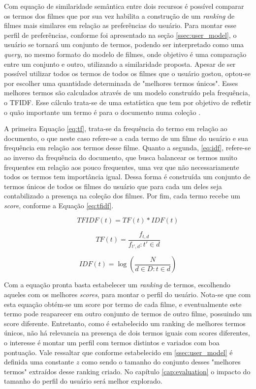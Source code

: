 Com equação de similaridade semântica entre dois recursos é possível comparar os termos dos filmes que por sua vez habilita a construção de um \textit{ranking} de filmes mais similares em relação as preferências do usuário. Para montar esse perfil de preferências, conforme foi apresentado na seção \ref{ssec:user_model}, o usuário se tornará um conjunto de termos, podendo ser interpretado como uma \textit{query}, no mesmo formato do modelo de filmes, onde objetivo é uma comparação entre um conjunto e outro, utilizando a similaridade proposta. Apesar de ser possível utilizar todos os termos de todos os filmes que o usuário gostou, optou-se por escolher uma quantidade determinada de "melhores termos únicos". Esses melhores termos são calculados através de um modelo construído pela frequência, o \ac{TFIDF}. Esse cálculo trata-se de uma estatística que tem por objetivo de refletir o quão importante um termo é para o documento numa coleção \citep{rajaraman_ullman_2011}.

A primeira Equação \ref{eq:tf}, trata-se da frequência do termo em relação ao documento, o que neste caso refere-se a cada termo de um filme do usuário e sua frequência em relação aos termos desse filme. Quanto a segunda, \ref{eq:idf}, refere-se ao inverso da frequência do documento, que busca balancear os termos muito frequentes em relação aos pouco frequentes, uma vez que não necessariamente todos os termos tem importância igual. Dessa forma é construída um conjunto de termos únicos de todos os filmes do usuário que para cada um deles seja contabilizado a presença na coleção dos filmes. Por fim, cada termo recebe um \textit{score}, conforme a Equação {\ref{eq:tfidf}}.

\begin{equation}
	TFIDF(t) = TF(t) * IDF(t)
\label{eq:tfidf}
\end{equation}

\begin{equation}
	TF(t) = \frac{f_{t,d}}{f_{t',d} : t' \in d}
\label{eq:tf}
\end{equation}

\begin{equation}
	IDF(t) = \log (\frac{N}{d \in D : t \in d})
\label{eq:idf}
\end{equation}

Com a equação pronta basta estabelecer um \textit{ranking} de termos, escolhendo aqueles com os melhores \textit{scores}, para montar o perfil do usuário. Nota-se que com esta equação obtém-se um score por termo de cada filme, e eventualmente este termo pode reaparecer em outro conjunto de termos de outro filme, possuindo um score diferente. Entretanto, como é estabelecido um ranking de melhores termos únicos, não há relevancia na presença de dois termos iguais com scores diferentes, o interesse é montar um perfil com termos distintos e variados com boa pontuação. Vale ressaltar que conforme estabelecido em \ref{ssec:user_model} é definida uma constante $z$ como sendo o tamanho do conjunto desses "melhores termos" extraídos desse ranking criado. No capítulo \ref{cap:evaluation} o impacto do tamanho do perfil do usuário será melhor explorado. 


